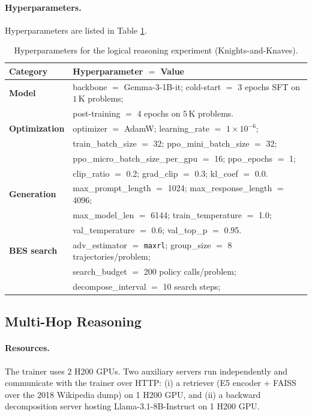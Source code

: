 \paragraph{Hyperparameters.}
Hyperparameters are listed in Table \ref{tab:hyperparams_logical}.

\begin{table}[h]
\centering
\caption{Hyperparameters for the logical reasoning experiment (Knights-and-Knaves).}
\label{tab:hyperparams_logical}
\begin{tabularx}{\textwidth}{@{}lX@{}}
\toprule
\textbf{Category} & \textbf{Hyperparameter $=$ Value} \\
\midrule
\textbf{Model} &
backbone $=$ Gemma-3-1B-it; cold-start $=$ 3 epochs SFT on $1\,$K problems; \\
& post-training $=$ 4 epochs on $5\,$K problems. \\
\midrule
\textbf{Optimization} &
optimizer $=$ AdamW; learning\_rate $=$ $1\!\times\!10^{-6}$; \\
& train\_batch\_size $=$ 32; ppo\_mini\_batch\_size $=$ 32; \\
& ppo\_micro\_batch\_size\_per\_gpu $=$ 16; ppo\_epochs $=$ 1; \\
& clip\_ratio $=$ 0.2; grad\_clip $=$ 0.3; kl\_coef $=$ 0.0. \\
\midrule
\textbf{Generation} &
max\_prompt\_length $=$ 1024; max\_response\_length $=$ 4096; \\
& max\_model\_len $=$ 6144; train\_temperature $=$ 1.0; \\
& val\_temperature $=$ 0.6; val\_top\_p $=$ 0.95. \\
\midrule
\textbf{BES search} &
adv\_estimator $=$ \texttt{maxrl}; group\_size $=$ 8 trajectories/problem; \\
& search\_budget $=$ 200 policy calls/problem; \\
& decompose\_interval $=$ 10 search steps;  \\
\bottomrule
\end{tabularx}
\end{table}


\subsection{Multi-Hop Reasoning}
\label{app:qa_setup}

\paragraph{Resources.}
The trainer uses 2 H200 GPUs. Two auxiliary
servers run independently and communicate with the trainer over HTTP:
(i) a retriever (E5 encoder + FAISS over the 2018 Wikipedia dump) on
1 H200 GPU, and (ii) a backward decomposition server hosting
Llama-3.1-8B-Instruct on 1 H200 GPU.

